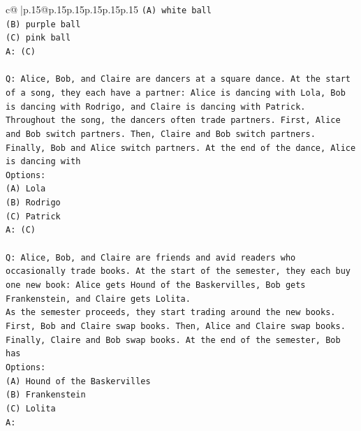 \documentclass{article}
\begin{document}
{\begin{supertabular}{c@{$\;$}|p{.15\linewidth}@{}p{.15\linewidth}p{.15\linewidth}p{.15\linewidth}p{.15\linewidth}p{.15\linewidth}}
{{{\texttt{(A) white ball} \\
\texttt{(B) purple ball} \\
\texttt{(C) pink ball} \\
\texttt{A: (C)} \\
\\ 
\texttt{Q: Alice, Bob, and Claire are dancers at a square dance. At the start of a song, they each have a partner: Alice is dancing with Lola, Bob is dancing with Rodrigo, and Claire is dancing with Patrick.} \\
\texttt{Throughout the song, the dancers often trade partners. First, Alice and Bob switch partners. Then, Claire and Bob switch partners. Finally, Bob and Alice switch partners. At the end of the dance, Alice is dancing with} \\
\texttt{Options:} \\
\texttt{(A) Lola} \\
\texttt{(B) Rodrigo} \\
\texttt{(C) Patrick} \\
\texttt{A: (C)} \\
\\ 
\texttt{Q: Alice, Bob, and Claire are friends and avid readers who occasionally trade books. At the start of the semester, they each buy one new book: Alice gets Hound of the Baskervilles, Bob gets Frankenstein, and Claire gets Lolita.} \\
\texttt{As the semester proceeds, they start trading around the new books. First, Bob and Claire swap books. Then, Alice and Claire swap books. Finally, Claire and Bob swap books. At the end of the semester, Bob has} \\
\texttt{Options:} \\
\texttt{(A) Hound of the Baskervilles} \\
\texttt{(B) Frankenstein} \\
\texttt{(C) Lolita} \\
\texttt{A:} \\
            }
        }
    }
     \\ \\


\end{supertabular}}
\end{document}
